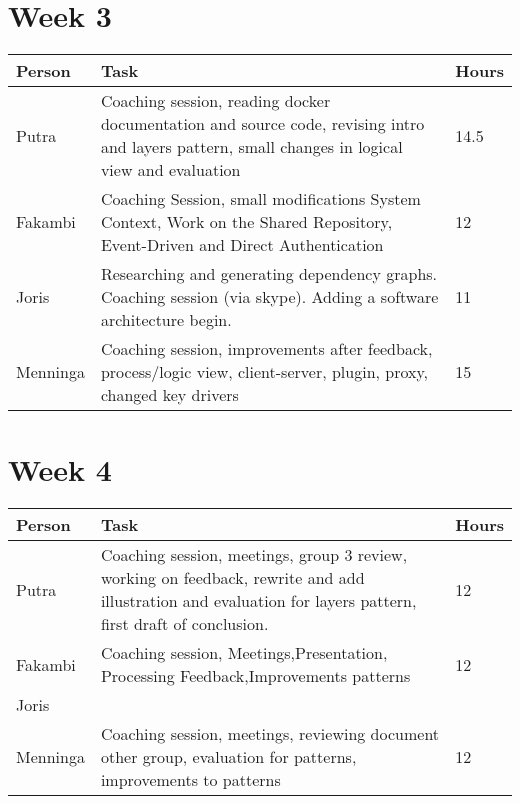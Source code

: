 \section*{Week 3}
\begin{longtable}{p{} p{} p{}}
	\textbf{Person} & \textbf{Task} & \textbf{Hours} \\ \toprule
	Putra           & Coaching session, reading docker documentation and source code, revising intro and layers pattern, small changes in logical view and evaluation & 14.5	\\ \midrule
	Fakambi         & Coaching Session, small modifications System Context, Work on the Shared Repository, Event-Driven and Direct Authentication &	12\\ \midrule
	Joris 			& Researching and generating dependency graphs. Coaching session (via skype). Adding a software architecture begin. & 11 \\ \midrule
	Menninga        & Coaching session, improvements after feedback, process/logic view, client-server, plugin, proxy, changed key drivers & 15 \\ \bottomrule
\end{longtable}

\section*{Week 4}
\begin{longtable}{p{} p{} p{}}
	\textbf{Person} & \textbf{Task} & \textbf{Hours} \\ \toprule
	Putra           & Coaching session, meetings, group 3 review, working on feedback, rewrite and add illustration and evaluation for layers pattern, first draft of conclusion. & 12 \\ \midrule
	Fakambi         & Coaching session, Meetings,Presentation, Processing Feedback,Improvements patterns & 12 \\ \midrule
	Joris 			& & \\ \midrule
	Menninga        & Coaching session, meetings, reviewing document other group, evaluation for patterns, improvements to patterns & 12 \\ \bottomrule
\end{longtable}